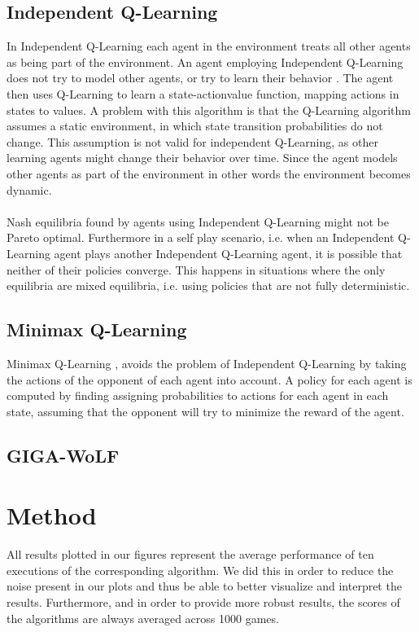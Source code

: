 \documentclass[a4paper,12pt]{article}
\begin{document}
\subsection{Independent Q-Learning}
In Independent Q-Learning each agent in the environment treats all other agents as being part of the environment. An agent employing Independent Q-Learning does not try to model other agents, or try to learn their behavior \cite{vlasis}. The agent then uses Q-Learning to learn a state-actionvalue function, mapping actions in states to values.
A problem with this algorithm is that the Q-Learning algorithm \cite{SB} assumes a static environment, in which state transition probabilities do not change. This assumption is not valid for independent Q-Learning, as other learning agents might change their behavior over time. Since the agent models other agents as part of the environment in other words the environment becomes dynamic.
\\ \\
Nash equilibria found by agents using Independent Q-Learning might not be Pareto optimal. Furthermore in a self play scenario, i.e. when an Independent Q-Learning agent plays another Independent Q-Learning agent, it is possible that neither of their policies converge. This happens in situations where the only equilibria are mixed equilibria, i.e. using policies that are not fully deterministic.

\subsection{Minimax Q-Learning}
Minimax Q-Learning \cite{minimax}, avoids the problem of Independent Q-Learning by taking the actions of the opponent of each agent into account. A policy for each agent is computed by finding assigning probabilities to actions for each agent in each state, assuming that the opponent will try to minimize the reward of the agent. 
\subsection{GIGA-WoLF}
\section{Method}

All results plotted in our figures represent the average performance of ten executions of the corresponding algorithm. We did this in order to reduce the noise present in our plots and thus be able to better visualize and interpret the results. Furthermore, and in order to provide more robust results, the scores of the algorithms are always averaged across 1000 games.
\end{document}

